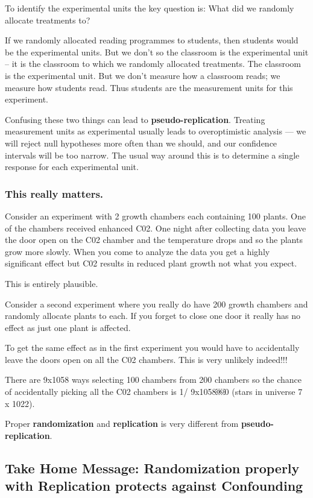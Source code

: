 \documentclass[
]{book}
\begin{document}
To identify the experimental units the key question is: What did we randomly allocate treatments to?

If we randomly allocated reading programmes to students, then students would be the experimental units. But we don't so the classroom is the experimental unit -- it is the classroom to which we randomly allocated treatments. The classroom is the experimental unit. But we don't measure how a classroom reads; we measure how students read. Thus students are the measurement units for this experiment.

Confusing these two things can lead to \textbf{pseudo-replication}. Treating measurement units as experimental usually leads to overoptimistic analysis --- we will reject null hypotheses more often than we should, and our confidence intervals will be too narrow. The usual way around this is to determine a single response for each experimental unit.

\hypertarget{this-really-matters.}{%
\subsubsection{This really matters.}\label{this-really-matters.}}

Consider an experiment with 2 growth chambers each containing 100 plants. One of the chambers received enhanced C02. One night after collecting data you leave the door open on the C02 chamber and the temperature drops and so the plants grow more slowly. When you come to analyze the data you get a highly significant effect but C02 results in reduced plant growth not what you expect.

This is entirely plausible.

Consider a second experiment where you really do have 200 growth chambers and randomly allocate plants to each. If you forget to close one door it really has no effect as just one plant is affected.

To get the same effect as in the first experiment you would have to accidentally leave the doors open on all the C02 chambers. This is very unlikely indeed!!!

There are 9x1058 ways selecting 100 chambers from 200 chambers so the chance of accidentally picking all the C02 chambers is 1/ 9x1058￼0 (stars in universe 7 x 1022).

Proper \textbf{randomization} and \textbf{replication} is very different from \textbf{pseudo-replication}.

\hypertarget{take-home-message-randomization-properly-with-replication-protects-against-confounding}{%
\subsection{Take Home Message: Randomization properly with Replication protects against Confounding}\label{take-home-message-randomization-properly-with-replication-protects-against-confounding}}
\end{document}
